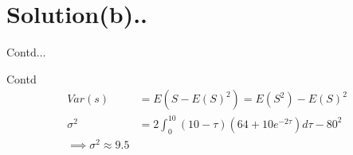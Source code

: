 \documentclass{beamer}
\begin{document}
    \section{Solution(b)..}
    \begin{frame}{Contd$\ldots$}
        \begin{block}{Contd}
    \begin{align}
        Var(s)&=E(S-E(S)^2)=E(S^2)-E(S)^2\\
        \sigma^2&=2\int_0^{10}(10-\tau)(64+10e^{-2\tau})d\tau-80^2\\
        \implies \boxed{\sigma^2\approx9.5}
    \end{align}
        \end{block}
    \end{frame}
    
\end{document}
